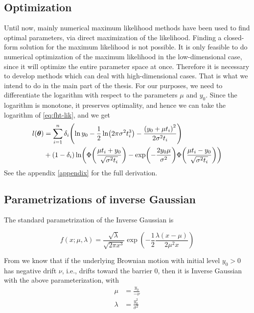 \subsection{Optimization}
Until now, mainly numerical maximum likelihood methods have been used to find optimal parameters, via direct maximization of the likelihood. Finding a closed-form solution for the maximum likelihood is not possible. It is only feasible to do numerical optimization of the maximum likelihood in the low-dimensional case, since it will optimize the entire parameter space at once. Therefore it is necessary to develop methods which can deal with high-dimensional cases. That is what we intend to do in the main part of the thesis. For our purposes, we need to differentiate the logarithm with respect to the parameters $\mu$ and $y_0$. Since the logarithm is monotone, it preserves optimality, and hence we can take the logarithm of \eqref{eq:fht-lik}, and we get
\begin{align}\label{eq:loglik}
\begin{split}
    l(\btheta)&=\sum_{i=1}^n\di\p*{\ln y_0-\frac{1}{2}\ln\p*{2\pi\sigma^2\ti^3}-\frac{\p*{y_0+\mu\ti}^2}{2\sigma^2\ti}} \\
    &+
    (1-\di)\ln\p*{\Phi\p*{\frac{\mu\ti+y_0}{\sqrt{\sigma^2\ti}}}-\exp\p*{-\frac{2y_0\mu}{\sigma^2}}\Phi\p*{\frac{\mu\ti-y_0}{\sqrt{\sigma^2\ti}}}}
\end{split}
\end{align}
See the appendix \ref{appendix} for the full derivation.



\subsection{Parametrizations of inverse Gaussian}
The standard parametrization of the Inverse Gaussian is

\begin{equation*}
    f(x;\mu,\lambda)=
    \frac{\sqrt{\lambda}}{\sqrt{2\pi x^3}}\exp\left(-\frac{1}{2}\frac{\lambda(x-\mu)}{2\mu^2x}\right)
\end{equation*}

From \citet{chhikara1988} we know that if the underlying Brownian motion with initial level $y_0>0$ has negative drift $\nu$, i.e., drifts toward the barrier 0, then it is Inverse Gaussian with the above parameterization, with
\begin{align*}
    \mu&=\frac{y_0}{-\nu} \\
    \lambda&=\frac{y_0^2}{\sigma^2}
\end{align*}



